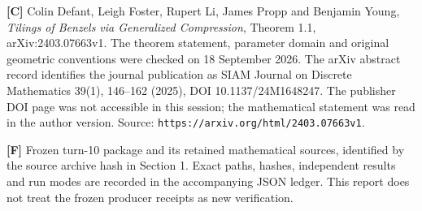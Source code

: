 \documentclass[
  11pt,
]{article}
\begin{document}
\textbf{{[}C{]}} Colin Defant, Leigh Foster, Rupert Li, James Propp and
Benjamin Young, \emph{Tilings of Benzels via Generalized Compression},
Theorem 1.1, arXiv:2403.07663v1. The theorem statement, parameter domain
and original geometric conventions were checked on 18 September 2026.
The arXiv abstract record identifies the journal publication as SIAM
Journal on Discrete Mathematics 39(1), 146--162 (2025), DOI
10.1137/24M1648247. The publisher DOI page was not accessible in this
session; the mathematical statement was read in the author version.
Source: \texttt{https://arxiv.org/html/2403.07663v1}.

\textbf{{[}F{]}} Frozen turn-10 package and its retained mathematical
sources, identified by the source archive hash in Section 1. Exact
paths, hashes, independent results and run modes are recorded in the
accompanying JSON ledger. This report does not treat the frozen producer
receipts as new verification.
\end{document}
